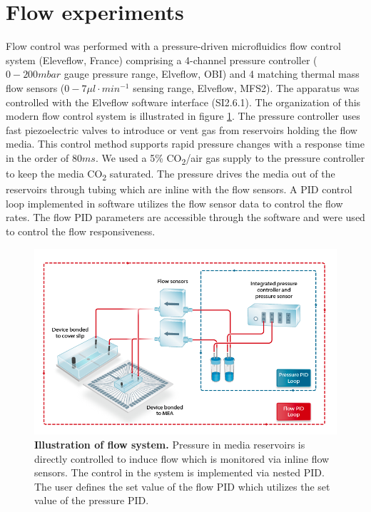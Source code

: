 \section{Flow experiments}
\label{sec:methods:flow}
Flow control was performed with a pressure-driven microfluidics flow control system (Eleveflow, France) comprising a 4-channel pressure controller (\(0-200 mbar\) gauge pressure range, Elveflow, OBI) and 4 matching thermal mass flow sensors (\(0-7 \mu l\cdot min^{-1}\) sensing range, Elveflow, MFS2). The apparatus was controlled with the Elveflow software interface (SI2.6.1). The organization of this modern flow control system is illustrated in figure \ref{fig:methods:schematics}. The pressure controller uses fast piezoelectric valves to introduce or vent gas from reservoirs holding the flow media. This control method supports rapid pressure changes with a response time in the order of \(80ms\). We used a 5\% CO\textsubscript{2}/air gas supply to the pressure controller to keep the media CO\textsubscript{2} saturated. The pressure drives the media out of the reservoirs through tubing which are inline with the flow sensors. A PID control loop implemented in software utilizes the flow sensor data to control the flow rates. The flow PID parameters are accessible through the software and were used to control the flow responsiveness.

       \begin{figure}[!htb]
            \centering
            \includegraphics[width=14cm]{chapter2/figures/Schematics/schematics.png}
            \caption[Illustration of flow system]{\textbf{Illustration of flow system.} Pressure in media reservoirs is directly controlled to induce flow which is monitored via inline flow sensors. The control in the system is implemented via nested PID. The user defines the set value of the flow PID which utilizes the set value of the pressure PID.}
            \label{fig:methods:schematics}

        \end{figure}


